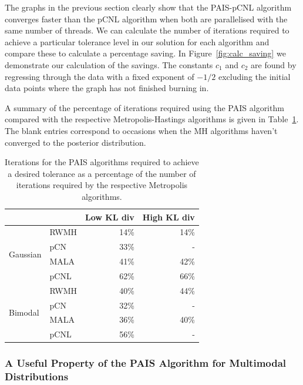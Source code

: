\documentclass[final]{siamltex}
\begin{document}
The graphs in the previous section clearly show that the PAIS-pCNL algorithm converges faster than the pCNL algorithm when both are parallelised with the same number of threads. We can calculate the number of iterations required to achieve a particular tolerance level in our solution for each algorithm and compare these to calculate a percentage saving. In Figure~\ref{fig:calc_saving} we demonstrate our calculation of the savings. The constants $c_1$ and $c_2$ are found by regressing through the data with a fixed exponent of $-1/2$ excluding the initial data points where the graph has not finished burning in.

A summary of the percentage of iterations required using the PAIS algorithm compared with the respective Metropolis-Hastings algorithms is given in Table~\ref{table:calc_savings}. The blank entries correspond to occasions when the MH algorithms haven't converged to the posterior distribution.

\begin{table}[!h]
\centering
\begin{tabular}{|l|l|r|r|}
\hline
		& & Low KL div & High KL div \\ \hline
	\multirow{4}{*}{Gaussian}	&RWMH & 14\% & 14\% \\
	&pCN & 33\% & - \\
	&MALA & 41\% & 42\% \\
	&pCNL & 62\% & 66\% \\ \hline
	\multirow{4}{*}{Bimodal}	&RWMH & 40\% & 44\% \\
	&pCN & 32\% & - \\
	&MALA & 36\% & 40\% \\
	&pCNL & 56\% & - \\ \hline
\end{tabular}
\caption{Iterations for the PAIS algorithms required to achieve a desired tolerance as a percentage of the number of iterations required by the respective Metropolis algorithms.}
\label{table:calc_savings}
\end{table}

\subsubsection{A Useful Property of the PAIS Algorithm for Multimodal Distributions}
\end{document}
